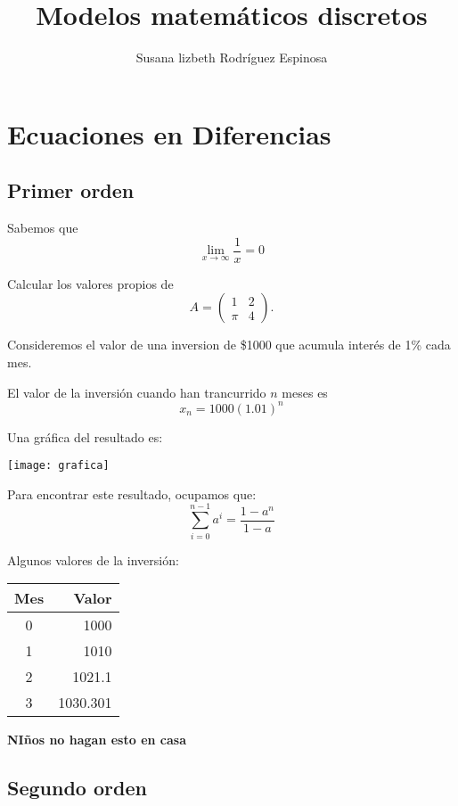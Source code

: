 \documentclass{article}
\title{Modelos matemáticos discretos}
\author{Susana lizbeth Rodríguez Espinosa}
\begin{document}
\maketitle
\section{Ecuaciones en Diferencias}
\subsection{Primer orden}
Sabemos que $$\lim_{x\to\infty}\frac{1}{x}=0$$

Calcular los valores propios de $$A=
\begin{pmatrix}
1 & 2\\
\pi & 4
\end{pmatrix}.
$$

Consideremos el valor de una inversion de \$1000 que acumula interés de 1\% cada mes.

El valor de la inversión cuando han trancurrido $n$ meses es $$x_n=1000(1.01)^n$$

Una gráfica del resultado es:

\begin{center}
\texttt{[image: grafica]}
\end{center}

Para encontrar este resultado, ocupamos que:
$$\sum_{i=0}^{n-1}a^i=\frac{1-a^{n}}{1-a}$$

Algunos valores de la inversión:
\begin{center}
\begin{tabular}{|c|r|}
\hline
\hline
Mes & Valor\\
\hline
0 & 1000\\
1 & 1010\\
2 & 1021.1\\
3 & 1030.301\\
\hline
\end{tabular}
\end{center}


\begin{center}
\huge
\textbf{NIños no hagan esto en casa}
\end{center}

\subsection{Segundo orden}
\end{document}
